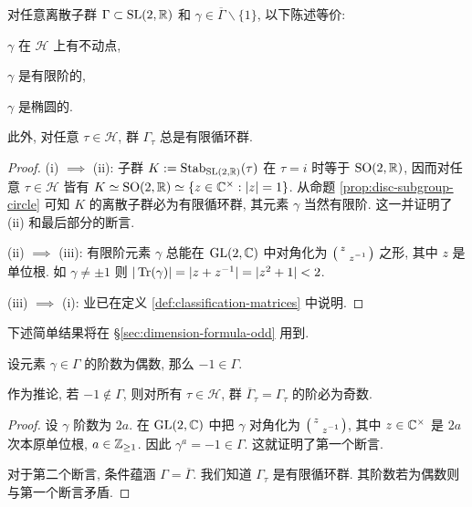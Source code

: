 \begin{proposition}\label{prop:stabilizer-finite-cyclic}
	对任意离散子群 $\Gamma \subset \operatorname{SL}(2,\mathbb{R})$ 和 $\gamma \in \overline{\Gamma} \smallsetminus \{1\}$, 以下陈述等价:
	\begin{compactenum}[(i)]
		\item $\gamma$ 在 $\mathcal{H}$ 上有不动点,
		\item $\gamma$ 是有限阶的,
		\item $\gamma$ 是椭圆的.
	\end{compactenum}
	此外, 对任意 $\tau \in \mathcal{H}$, 群 $\Gamma_\tau$ 总是有限循环群.
\end{proposition}
\begin{proof}
	(i) $\implies$ (ii): 子群 $K := \operatorname{Stab}_{\operatorname{SL}(2,\mathbb{R})}(\tau)$ 在 $\tau = i$ 时等于 $\operatorname{SO}(2,\mathbb{R})$, 因而对任意 $\tau \in \mathcal{H}$ 皆有 $K \simeq \operatorname{SO}(2,\mathbb{R}) \simeq \{z \in \mathbb{C}^\times: |z|=1 \}$. 从命题 \ref{prop:disc-subgroup-circle} 可知 $K$ 的离散子群必为有限循环群, 其元素 $\gamma$ 当然有限阶. 这一并证明了 (ii) 和最后部分的断言.

	(ii) $\implies$ (iii): 有限阶元素 $\gamma$ 总能在 $\operatorname{GL}(2,\mathbb{C})$ 中对角化为 $\bigl(\begin{smallmatrix} z &  \\  & z^{-1} \end{smallmatrix}\bigr)$ 之形, 其中 $z$ 是单位根. 如 $\gamma \neq \pm 1$ 则 $|\operatorname{Tr}(\gamma)| = |z + z^{-1}| = |z^2 + 1| < 2$.
	
	(iii) $\implies$ (i): 业已在定义 \ref{def:classification-matrices} 中说明.
\end{proof}

下述简单结果将在 \S\ref{sec:dimension-formula-odd} 用到.
\begin{proposition}\label{prop:elliptic-odd}
	设元素 $\gamma \in \Gamma$ 的阶数为偶数, 那么 $-1 \in \Gamma$.
	
	作为推论, 若 $-1 \notin \Gamma$, 则对所有 $\tau \in \mathcal{H}$, 群 $\overline{\Gamma}_\tau = \Gamma_\tau$ 的阶必为奇数.
\end{proposition}
\begin{proof}
	设 $\gamma$ 阶数为 $2a$. 在 $\operatorname{GL}(2, \mathbb{C})$ 中把 $\gamma$ 对角化为 $\bigl(\begin{smallmatrix} z &  \\  & z^{-1} \end{smallmatrix}\bigr)$, 其中 $z \in \mathbb{C}^\times$ 是 $2a$ 次本原单位根, $a \in \mathbb{Z}_{\geq 1}$. 因此 $\gamma^a = -1 \in \Gamma$. 这就证明了第一个断言.
	
	对于第二个断言, 条件蕴涵 $\Gamma = \overline{\Gamma}$. 我们知道 $\Gamma_\tau$ 是有限循环群. 其阶数若为偶数则与第一个断言矛盾.
\end{proof}


